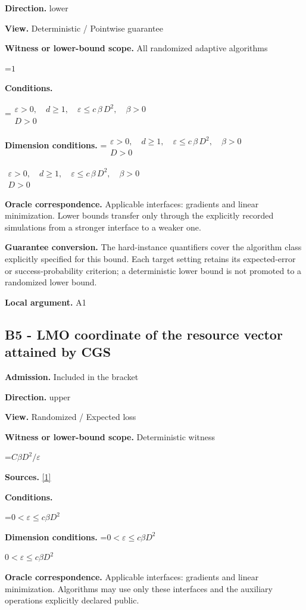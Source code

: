 \documentclass[10pt,a4paper]{article}
\newcommand{\AtlasMath}[1]{\par\begingroup\centering\setbox0=\hbox{$\displaystyle #1$}\ifdim\wd0>1.4\linewidth\typeout{ATLAS WIDE FORMULA: \the\wd0}\fi\ifdim\wd0>\linewidth\resizebox{\linewidth}{!}{\box0}\else\box0\fi\par\endgroup}
\newcommand{\AtlasInlineMath}[1]{\begingroup\setbox0=\hbox{$#1$}\ifdim\wd0>.4\linewidth\endgroup\AtlasMath{#1}\else\endgroup$#1$\fi}
\begin{document}
\textbf{Direction.} lower

\textbf{View.} Deterministic / Pointwise guarantee

\textbf{Witness or lower-bound scope.} All randomized adaptive algorithms

\AtlasMath{1}
\textbf{Conditions.} 
\AtlasMath{\begin{gathered}\varepsilon > 0,\quad d \ge 1,\quad \varepsilon \le c\,\beta\,{D}^{2},\quad \beta > 0\\D > 0\end{gathered}}


\textbf{Dimension conditions.} \AtlasInlineMath{\begin{gathered}\varepsilon > 0,\quad d \ge 1,\quad \varepsilon \le c\,\beta\,{D}^{2},\quad \beta > 0\\D > 0\end{gathered}}

\textbf{Oracle correspondence.} Applicable interfaces: gradients and linear minimization. Lower bounds transfer only through the explicitly recorded simulations from a stronger interface to a weaker one.

\textbf{Guarantee conversion.} The hard-instance quantifiers cover the algorithm class explicitly specified for this bound. Each target setting retains its expected-error or success-probability criterion; a deterministic lower bound is not promoted to a randomized lower bound.

\textbf{Local argument.} A1

\subsection{B5 - LMO coordinate of the resource vector attained by CGS}
\textbf{Admission.} Included in the bracket

\textbf{Direction.} upper

\textbf{View.} Randomized / Expected loss

\textbf{Witness or lower-bound scope.} Deterministic witness

\AtlasMath{C\beta D^2/\varepsilon}
\textbf{Sources.} \href{https://optimization-online.org/wp-content/uploads/2014/10/4605.pdf}{[1]}

\textbf{Conditions.} 
\AtlasMath{0<\varepsilon\le c\beta D^2}


\textbf{Dimension conditions.} \AtlasInlineMath{0<\varepsilon\le c\beta D^2}

\textbf{Oracle correspondence.} Applicable interfaces: gradients and linear minimization. Algorithms may use only these interfaces and the auxiliary operations explicitly declared public.
\end{document}
